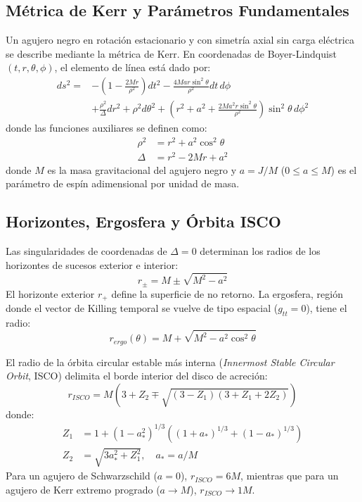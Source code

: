 \documentclass[10pt,twocolumn,a4paper]{article}
\begin{document}
\subsection{Métrica de Kerr y Parámetros Fundamentales}
Un agujero negro en rotación estacionario y con simetría axial sin carga eléctrica se describe mediante la métrica de Kerr. En coordenadas de Boyer-Lindquist $(t, r, \theta, \phi)$, el elemento de línea está dado por:
\begin{align}
ds^2 = &-\left(1 - \frac{2Mr}{\rho^2}\right) dt^2 - \frac{4Mar\sin^2\theta}{\rho^2} dt\,d\phi \nonumber \\
&+ \frac{\rho^2}{\Delta} dr^2 + \rho^2 d\theta^2 + \left(r^2 + a^2 + \frac{2Ma^2r\sin^2\theta}{\rho^2}\right)\sin^2\theta\,d\phi^2
\end{align}
donde las funciones auxiliares se definen como:
\begin{align}
\rho^2 &= r^2 + a^2 \cos^2\theta \\
\Delta &= r^2 - 2Mr + a^2
\end{align}
donde $M$ es la masa gravitacional del agujero negro y $a = J/M$ ($0 \le a \le M$) es el parámetro de espín adimensional por unidad de masa.

\subsection{Horizontes, Ergosfera y Órbita ISCO}
Las singularidades de coordenadas de $\Delta = 0$ determinan los radios de los horizontes de sucesos exterior e interior:
\begin{equation}
r_\pm = M \pm \sqrt{M^2 - a^2}
\end{equation}
El horizonte exterior $r_+$ define la superficie de no retorno. La ergosfera, región donde el vector de Killing temporal se vuelve de tipo espacial ($g_{tt} = 0$), tiene el radio:
\begin{equation}
r_{ergo}(\theta) = M + \sqrt{M^2 - a^2 \cos^2\theta}
\end{equation}

El radio de la órbita circular estable más interna (\textit{Innermost Stable Circular Orbit}, ISCO) delimita el borde interior del disco de acreción:
\begin{equation}
r_{ISCO} = M \left(3 + Z_2 \mp \sqrt{(3 - Z_1)(3 + Z_1 + 2Z_2)}\right)
\end{equation}
donde:
\begin{align}
Z_1 &= 1 + (1 - a_*^2)^{1/3} \left((1 + a_*)^{1/3} + (1 - a_*)^{1/3}\right) \\
Z_2 &= \sqrt{3a_*^2 + Z_1^2}, \quad a_* = a/M
\end{align}
Para un agujero de Schwarzschild ($a = 0$), $r_{ISCO} = 6M$, mientras que para un agujero de Kerr extremo progrado ($a \to M$), $r_{ISCO} \to 1M$.
\end{document}
